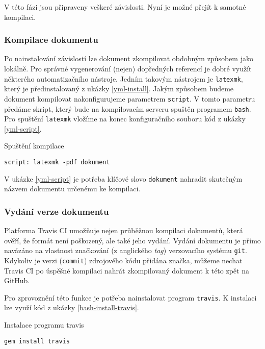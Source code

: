 \documentclass[a4paper]{article}
\begin{document}
V této fázi jsou připraveny veškeré závislosti.
Nyní je možné přejít k samotné kompilaci.

\subsubsection*{Kompilace dokumentu}

Po nainstalování závislostí lze dokument zkompilovat obdobným způsobem jako lokálně.
Pro správné vygenerování (nejen) dopředných referencí je dobré využít některého automatizačního nástroje.
Jedním takovým nástrojem je \texttt{latexmk}, který je předinstalovaný z ukázky \ref{yml-install}.
Jakým způsobem budeme dokument kompilovat nakonfigurujeme parametrem \texttt{script}.
V tomto parametru předáme skript, který bude na kompilovacím serveru spuštěn programem \texttt{bash}.
Pro spuštění \texttt{latexmk} vložíme na konec konfiguračního souboru kód z ukázky \ref{yml-script}.

\begin{listing}[htbp]
\caption{\label{yml-script} Spuštění kompilace}
\begin{verbatim}
script: latexmk -pdf dokument
\end{verbatim}
\end{listing}

V ukázke \ref{yml-script} je potřeba klíčové slovo \texttt{dokument} nahradit skutečným názvem dokumentu určenému ke kompilaci.

\subsubsection*{Vydání verze dokumentu}

Platforma Travis CI umožňuje nejen průběžnou kompilaci dokumentů, která ověří, že formát není poškozený, ale také jeho vydání.
Vydání dokumentu je přímo navázáno na vlastnost značkování (z anglického \textit{tag}) verzovacího systému \texttt{git}.
Kdykoliv je verzi (\texttt{commit}) zdrojového kódu přidána značka, můžeme nechat Travis CI po úspěšné kompilaci nahrát zkompilovaný dokument k této zpět na GitHub.

Pro zprovoznění této funkce je potřeba nainstalovat program \texttt{travis}.
K instalaci lze využí kód z ukázky \ref{bash-install-travis}.

\begin{listing}[htbp]
\caption{\label{bash-install-travis} Instalace programu travis}
\begin{verbatim}
gem install travis
\end{verbatim}
\end{listing}
\end{document}
